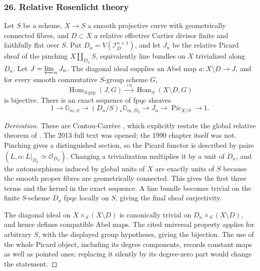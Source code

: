 \subsubsection{26. Relative Rosenlicht theory}
\begin{theorem}\label{B:subject26}
Let $S$ be a scheme, $X\to S$ a smooth projective curve with geometrically connected fibres, and $D\subset X$ a relative effective Cartier divisor finite and faithfully flat over $S$. Put $D_n=V(\mathcal I_D^{n+1})$, and let $J_n$ be the relative Picard sheaf of the pinching $X\amalg_{D_n}S$, equivalently line bundles on $X$ trivialized along $D_n$. Let $J=\varprojlim_nJ_n$. The diagonal ideal supplies an Abel map $a:X\setminus D\to J$, and for every smooth commutative $S$-group scheme $G$,
\[
 \operatorname{Hom}_{S\text{-}\mathrm{grp}}(J,G)
 \xrightarrow{\ \circ a\ }\operatorname{Hom}_S(X\setminus D,G)
\]
is bijective. There is an exact sequence of fpqc sheaves
\[
 1\longrightarrow\mathbb G_{m,S}
 \longrightarrow (D_n/S)_*\mathbb G_{m,D_n}
 \longrightarrow J_n\longrightarrow\operatorname{Pic}_{X/S}
 \longrightarrow1.
\]
\end{theorem}
\begin{proof}[Derivation]
These are Contou-Carr\`ere \cite[\S1.2, (1.2.1)--(1.2.4)]{BContouCarrere2013}, which explicitly restate the global relative theorem of \cite{BContouCarrere1990}. The 2013 full text was opened; the 1990 chapter itself was not. Pinching gives a distinguished section, so the Picard functor is described by pairs $(L,\alpha:L|_{D_n}\simeq\mathcal O_{D_n})$. Changing a trivialization multiplies it by a unit of $D_n$, and the automorphisms induced by global units of $X$ are exactly units of $S$ because the smooth proper fibres are geometrically connected. This gives the first three terms and the kernel in the exact sequence. A line bundle becomes trivial on the finite $S$-scheme $D_n$ fpqc locally on $S$, giving the final sheaf surjectivity.

The diagonal ideal on $X\times_S(X\setminus D)$ is canonically trivial on $D_n\times_S(X\setminus D)$, and hence defines compatible Abel maps. The cited universal property applies for arbitrary $S$, with the displayed group hypotheses, giving the bijection. The use of the whole Picard object, including its degree components, records constant maps as well as pointed ones; replacing it silently by its degree-zero part would change the statement.
\end{proof}

